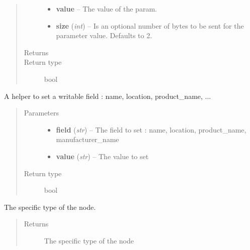 \documentclass[letterpaper,10pt,english]{sphinxmanual}
\begin{document}
\begin{fulllineitems}
\begin{fulllineitems}
\begin{quote}
\begin{description}
\begin{itemize}
\item {} 
\textbf{value} -- The value of the param.

\item {} 
\textbf{size} (\emph{int}) -- Is an optional number of bytes to be sent for the parameter value. Defaults to 2.

\end{itemize}

\item[{Returns}] \leavevmode


\item[{Return type}] \leavevmode
bool

\end{description}\end{quote}

\end{fulllineitems}


\begin{fulllineitems}
\label{node:openzwave.node.ZWaveNode.set_field}
A helper to set a writable field : name, location, product\_name, ...
\begin{quote}\begin{description}
\item[{Parameters}] \leavevmode\begin{itemize}
\item {} 
\textbf{field} (\emph{str}) -- The field to set : name, location, product\_name, manufacturer\_name

\item {} 
\textbf{value} (\emph{str}) -- The value to set

\end{itemize}

\item[{Return type}] \leavevmode
bool

\end{description}\end{quote}

\end{fulllineitems}


\begin{fulllineitems}
\label{node:openzwave.node.ZWaveNode.specific}
The specific type of the node.
\begin{quote}\begin{description}
\item[{Returns}] \leavevmode
The specific type of the node


\end{description}
\end{quote}
\end{fulllineitems}
\end{fulllineitems}
\end{document}
